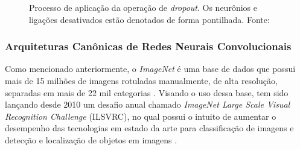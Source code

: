 \begin{figure}[h!]
  \centering
\caption{Processo de aplicação da operação de \emph{dropout}. Os neurônios e ligações desativados estão denotados de forma pontilhada. Fonte: \cite{dsacademy}}
  \hfill
  \label{fig:dropout}
\end{figure}



\subsubsection{Arquiteturas Canônicas de Redes Neurais Convolucionais}
\label{subsubsec:arq-cnns}

Como mencionado anteriormente, o \emph{ImageNet} é uma base de dados que possui mais de 15 milhões de imagens rotuladas manualmente, de alta resolução, separadas em mais de 22 mil categorias \cite{imagenet}. Visando o uso dessa base, tem sido lançando desde 2010 um desafio anual chamado \emph{ImageNet Large Scale Visual Recognition Challenge} (ILSVRC), no qual possui o intuito de aumentar o desempenho das tecnologias em estado da arte para classificação de imagens e detecção e localização de objetos em imagens \cite{sewak}.

